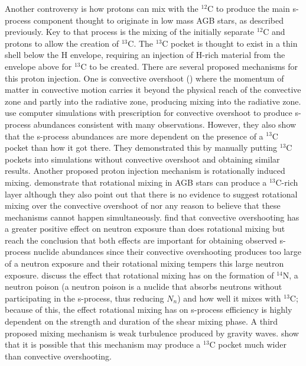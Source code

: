
Another controversy is how protons can mix with the $^{12}$C  to
produce the main s-process component thought to originate 
in low mass AGB stars, as described previously.
Key to that process is the mixing of the initially separate $^{12}$C
and protons to allow the creation of $^{13}$C.  The $^{13}$C pocket is
thought to exist in a thin shell below the H envelope, requiring an
injection of H-rich material from the envelope above for $^{13}$C to
be created. There are
several proposed mechanisms for this proton injection.  One is
convective overshoot (\citealt{herwigetal1997}) where the momentum of
matter in convective motion carries it beyond the physical reach of
the convective zone and partly into the radiative zone, producing
mixing into the radiative zone. \cite{lugaroetal2003} use computer
simulations with prescription for convective overshoot to produce
s-process abundances consistent with many observations. However, they 
also show that the s-process abundances are more dependent on the
presence of a $^{13}$C pocket than how it got there.  They
demonstrated this  by manually putting $^{13}$C pockets
into simulations without convective overshoot and obtaining similar
results. Another proposed proton injection mechanism is rotationally
induced mixing.  \cite{langeretal1999} demonstrate that rotational
mixing in AGB stars can produce a $^{13}$C-rich layer although they
also point out that there is no evidence to suggest rotational mixing
over the convective overshoot of \cite{herwigetal1997} nor any reason
to believe that these mechanisms cannot happen
simultaneously.  \cite{herwig2003} find that convective overshooting
has a greater positive effect on neutron exposure than does rotational
mixing but reach the conclusion that both effects are important for
obtaining observed s-process nuclide abundances since their convective
overshooting produces too large of a neutron exposure and their
rotational mixing tempers this large neutron
exposure.  \cite{siess2004} discuss the effect that rotational mixing
has on the formation of $^{14}$N, a neutron poison (a neutron poison
is a nuclide that absorbs
neutrons without participating in the s-process, thus reducing $N_n$)
and how well it mixes with $^{13}$C; because of this, the
effect rotational mixing has on s-process efficiency is highly
dependent on the strength and duration of the shear mixing phase.  A
third proposed mixing mechanism is weak turbulence produced by gravity
waves.  \cite{denissenkov2003} show that it is possible that this mechanism may
produce a $^{13}$C pocket much wider than convective overshooting.

